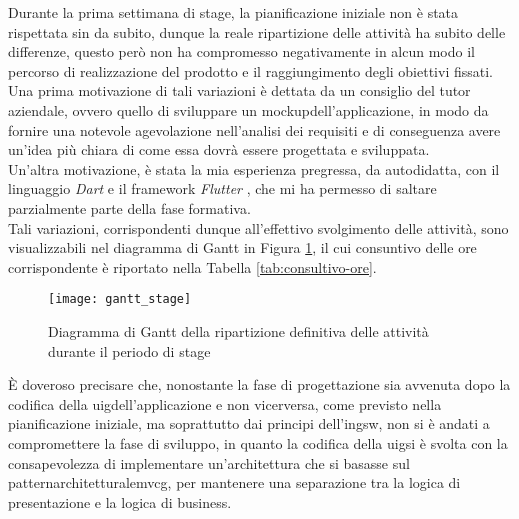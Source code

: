 Durante la prima settimana di stage, la pianificazione iniziale non è stata rispettata sin da subito, dunque la reale ripartizione delle attività ha subito delle differenze, questo però non ha compromesso negativamente in alcun modo il percorso di realizzazione del prodotto e il raggiungimento degli obiettivi fissati.\\
Una prima motivazione di tali variazioni è dettata da un consiglio del tutor aziendale, ovvero quello di sviluppare un \gls{mockup}\glsoccur dell'applicazione, in modo da fornire una notevole agevolazione nell'analisi dei requisiti e di conseguenza avere un'idea più chiara di come essa dovrà essere progettata e sviluppata.\\
Un'altra motivazione, è stata la mia esperienza pregressa, da autodidatta, con il linguaggio \emph{Dart} \cite{site:dart} e il framework \emph{Flutter} \cite{site:flutter}, che mi ha permesso di saltare parzialmente parte della fase formativa.\\
Tali variazioni, corrispondenti dunque all'effettivo svolgimento delle attività, sono visualizzabili nel diagramma di Gantt in Figura \ref{fig:gantt}, il cui consuntivo delle ore corrispondente è riportato nella Tabella \ref{tab:consultivo-ore}.

\begin{figure}[!h] 
    \centering 
    \texttt{[image: gantt\_stage]} 
    \caption{Diagramma di Gantt della ripartizione definitiva delle attività durante il periodo di stage}
    \label{fig:gantt}
\end{figure}

È doveroso precisare che, nonostante la fase di progettazione sia avvenuta dopo la codifica della \gls{uig}\glsoccur dell'applicazione e non vicerversa, come previsto nella pianificazione iniziale, ma soprattutto dai principi dell'\gls{ingsw}\glsoccur, non si è andati a compromettere la fase di sviluppo, in quanto la codifica della \gls{uig}\glsoccur si è svolta con la consapevolezza di implementare un'architettura che si basasse sul \gls{patternarchitetturale}\glsoccur \Gls{mvcg}\glsoccur, per mantenere una separazione tra la logica di presentazione e la logica di business.

